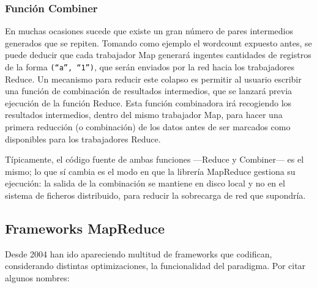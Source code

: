 \subsubsection{Funci\'on Combiner}\label{subsubsec:combiner}
\noindent En muchas ocasiones sucede que existe un gran n\'umero de pares intermedios generados que se repiten. Tomando como ejemplo el wordcount expuesto antes, se puede deducir que cada trabajador Map generar\'a ingentes cantidades de registros de la forma \texttt{(``a'', ``1'')}, que ser\'an enviados por la red hacia los trabajadores Reduce. Un mecanismo para reducir este colapso es permitir al usuario escribir una funci\'on de combinaci\'on de resultados intermedios, que se lanzar\'a previa ejecuci\'on de la funci\'on Reduce. Esta funci\'on combinadora ir\'a recogiendo los resultados intermedios, dentro del mismo trabajador Map, para hacer una primera reducci\'on (o combinaci\'on) de los datos antes de ser marcados como disponibles para los trabajadores Reduce.\newline

T\'ipicamente, el c\'odigo fuente de ambas funciones ---Reduce y Combiner--- es el mismo; lo que s\'i cambia es el modo en que la librer\'ia MapReduce gestiona su ejecuci\'on: la salida de la combinaci\'on se mantiene en disco local y no en el sistema de ficheros distribuido, para reducir la sobrecarga de red que supondr\'ia.


\subsection{Frameworks MapReduce}\label{subsec:frameworksmapred}
\noindent Desde 2004 han ido apareciendo multitud de frameworks que codifican, considerando distintas optimizaciones, la funcionalidad del paradigma. Por citar algunos nombres:

